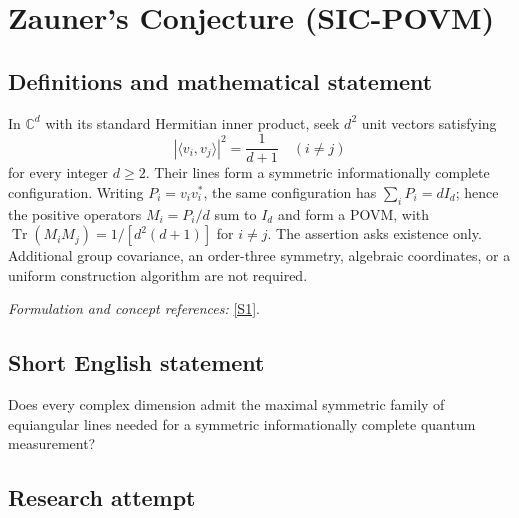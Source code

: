 \documentclass[11pt,a4paper]{article}
\newcommand{\C}{\mathbb{C}}
\newcommand{\sref}[2]{\hyperlink{source:#1:#2}{[S#2]}}
\newif\ifshowcatalogue
\newcommand{\cataloguescope}[1]{\ifshowcatalogue
 \paragraph{Exact scope in the supplied catalogue.}
 \begin{quote}\small #1\end{quote}\fi}
\numberwithin{equation}{section}
\begin{document}
\setcounter{section}{0}
\clearpage
\section*{\texorpdfstring{Zauner's Conjecture (SIC-POVM)}{Zauner's Conjecture (SIC-POVM)}}\label{1305}
\subsection{Definitions and mathematical statement}
In $\C^d$ with its standard Hermitian inner product, seek $d^2$ unit vectors satisfying
\[
 |\langle v_i,v_j\rangle|^2=\frac1{d+1}\quad(i\ne j)
\]
for every integer $d\ge2$. Their lines form a symmetric informationally complete configuration. Writing $P_i=v_iv_i^*$, the same configuration has
$\sum_iP_i=dI_d$; hence the positive operators $M_i=P_i/d$ sum to $I_d$ and form a POVM, with
$\operatorname{Tr}(M_iM_j)=1/[d^2(d+1)]$ for $i\ne j$. The assertion asks existence only. Additional group covariance, an order-three symmetry, algebraic coordinates, or a uniform construction algorithm are not required.
\par\smallskip\textit{Formulation and concept references:} \sref{1305}{1}.
\cataloguescope{Decide whether for EVERY integer d>=2 there exist d\textasciicircum{}2 unit vectors v\_1,...,v\_(d\textasciicircum{}2) in the standard complex Hilbert space C\textasciicircum{}d with |<v\_i,v\_j>|\textasciicircum{}2=1/(d+1) whenever i!=j. Their complex lines are distinct. Equivalently, their rank-one projectors P\_i=v\_i v\_i\textasciicircum{}* have sum\_i P\_i=d I\_d and define SIC-POVM elements M\_i=P\_i/d; for i!=j the normalized trace is Tr(M\_i M\_j)=1/[d\textasciicircum{}2(d+1)]. No Weyl-Heisenberg covariance, order-three symmetry, explicit coordinates or uniform construction algorithm is imposed.}
\subsection{Short English statement}
Does every complex dimension admit the maximal symmetric family of equiangular lines needed for a symmetric informationally complete quantum measurement?
\subsection{Research attempt}
\end{document}

